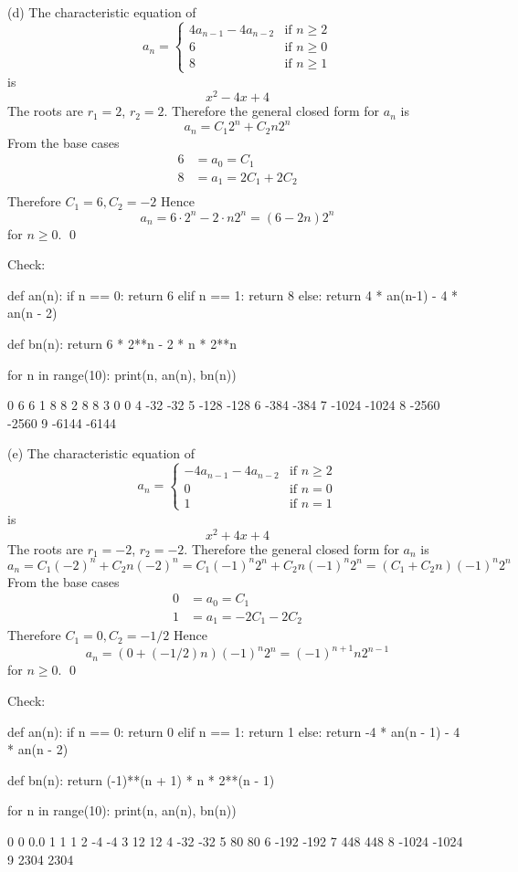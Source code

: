 (d)
The characteristic equation of
\[
a_n = 
\begin{cases}
  4 a_{n-1} - 4 a_{n-2} &\text{if } n \geq 2 \\
  6                   &\text{if } n \geq 0 \\
  8                   &\text{if } n \geq 1
\end{cases}
\]
is
\[
x^2 - 4x + 4
\]
The roots are $r_1 = 2$, $r_2 = 2$.
Therefore the general closed form for $a_n$ is
\[
a_n = C_1 2^n + C_2 n2^n
\]
From the base cases
\begin{align*}
6 &= a_0 = C_1 \\
8 &= a_1 = 2C_1 + 2C_2 \\
\end{align*}
Therefore $C_1 = 6, C_2 = -2$
Hence
\[
a_n = 6 \cdot 2^n - 2 \cdot n 2^n = (6 - 2n) 2^n
\]
for $n \geq 0$.
\qed

Check:
\begin{console}[fontsize=\footnotesize]
def an(n):
    if n == 0: return 6
    elif n == 1: return 8
    else: return 4 * an(n-1) - 4 * an(n - 2)

def bn(n):
    return 6 * 2**n - 2 * n * 2**n

for n in range(10):
    print(n, an(n), bn(n))
\end{console}
\begin{console}[fontsize=\footnotesize]
0 6 6
1 8 8
2 8 8
3 0 0
4 -32 -32
5 -128 -128
6 -384 -384
7 -1024 -1024
8 -2560 -2560
9 -6144 -6144
\end{console}


(e)
The characteristic equation of
\[
a_n = 
\begin{cases}
 - 4 a_{n-1} - 4 a_{n-2} &\text{if } n \geq 2 \\
  0                    &\text{if } n = 0 \\
  1                    &\text{if } n = 1
\end{cases}
\]
is
\[
x^2 + 4x + 4
\]
The roots are $r_1 = -2$, $r_2 = -2$.
Therefore the general closed form for $a_n$ is
\[
a_n = C_1 (-2)^n + C_2 n(-2)^n
= C_1 (-1)^n 2^n + C_2 n(-1)^n 2^n
= (C_1 + C_2 n) (-1)^n 2^n
\]
From the base cases
\begin{align*}
0 &= a_0 = C_1 \\
1 &= a_1 = -2C_1 - 2C_2 
\end{align*}
Therefore $C_1 = 0, C_2 = -1/2$
Hence
\[
a_n = (0 + (-1/2)n) (-1)^n 2^n = (-1)^{n+1} n 2^{n - 1}
\]
for $n \geq 0$.
\qed

Check:
\begin{console}[fontsize=\footnotesize]
def an(n):
    if n == 0: return 0
    elif n == 1: return 1
    else: return -4 * an(n - 1) - 4 * an(n - 2)

def bn(n):
    return (-1)**(n + 1) * n * 2**(n - 1)

for n in range(10):
    print(n, an(n), bn(n))
\end{console}
\begin{console}[fontsize=\footnotesize]
0 0 0.0
1 1 1
2 -4 -4
3 12 12
4 -32 -32
5 80 80
6 -192 -192
7 448 448
8 -1024 -1024
9 2304 2304
\end{console}


